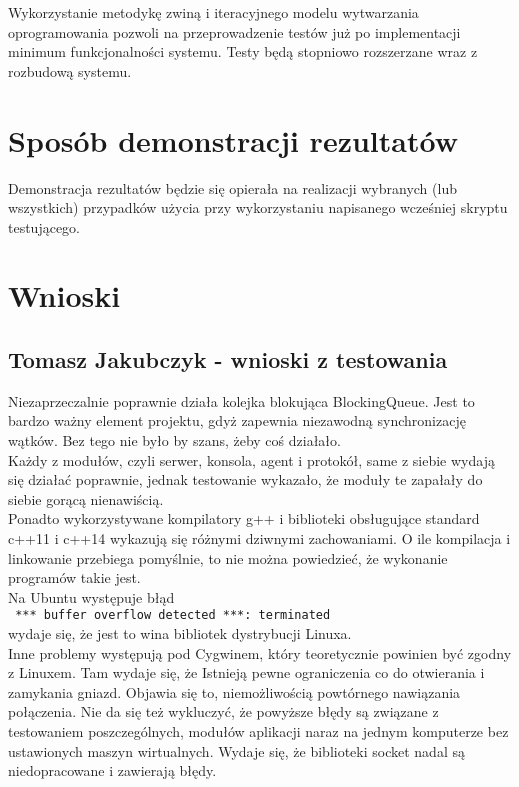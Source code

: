 \documentclass[10pt,a4paper]{article}
\begin{document}
	    Wykorzystanie metodykę zwiną i iteracyjnego modelu wytwarzania oprogramowania pozwoli na przeprowadzenie testów już po implementacji minimum funkcjonalności systemu. Testy będą stopniowo rozszerzane wraz z rozbudową systemu.

	\section{Sposób  demonstracji rezultatów}
		Demonstracja rezultatów będzie się opierała na realizacji wybranych (lub wszystkich) przypadków użycia przy wykorzystaniu napisanego wcześniej skryptu testującego.
		
	\section{Wnioski}
        \subsection{Tomasz Jakubczyk - wnioski z testowania}
            Niezaprzeczalnie poprawnie działa kolejka blokująca BlockingQueue. Jest to bardzo ważny element projektu, gdyż zapewnia niezawodną synchronizację wątków. Bez tego nie było by szans, żeby coś działało. \\
            Każdy z modułów, czyli serwer, konsola, agent i protokół, same z siebie wydają się działać poprawnie, jednak testowanie wykazało, że moduły te zapałały do siebie gorącą nienawiścią. \\
            Ponadto wykorzystywane kompilatory g++ i biblioteki obsługujące standard c++11 i c++14 wykazują się różnymi dziwnymi zachowaniami. O ile kompilacja i linkowanie przebiega pomyślnie, to nie można powiedzieć, że wykonanie programów takie jest. \\
            Na Ubuntu występuje błąd \\
            \texttt{ *** buffer overflow detected ***: terminated } \\
            wydaje się, że jest to wina bibliotek dystrybucji Linuxa. \\
            Inne problemy występują pod Cygwinem, który teoretycznie powinien być zgodny z Linuxem. Tam wydaje się, że Istnieją pewne ograniczenia co do otwierania i zamykania gniazd. Objawia się to, niemożliwością powtórnego nawiązania połączenia. Nie da się też wykluczyć, że powyższe błędy są związane z testowaniem poszczególnych, modułów aplikacji naraz na jednym komputerze bez ustawionych maszyn wirtualnych. Wydaje się, że biblioteki socket nadal są niedopracowane i zawierają błędy. \\
\end{document}
